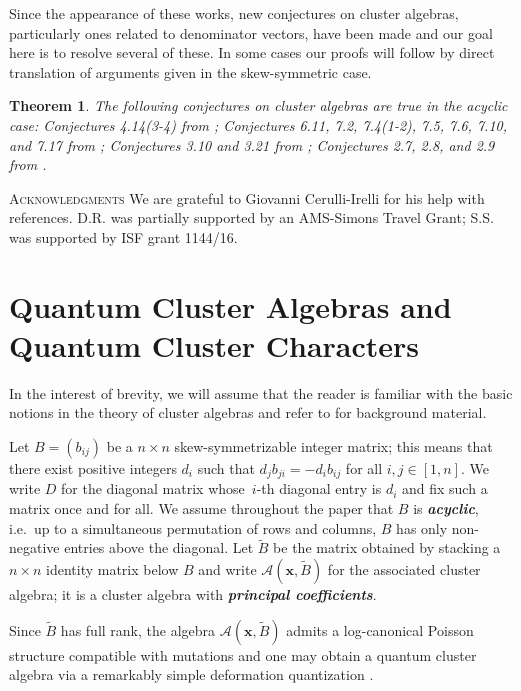 \documentclass[12pt]{amsart}
\newtheorem{theorem}{Theorem}
\newcommand{\bfx}{\mathbf{x}}
\newcommand{\cA}{\mathcal{A}}
\newcommand{\newword}[1]{\textbf{\emph{#1}}}
\begin{document}
  Since the appearance of these works, new conjectures on cluster algebras, particularly ones related to denominator vectors, have been made and our goal here is to resolve several of these.
  In some cases our proofs will follow by direct translation of arguments given in the skew-symmetric case. 
  \begin{theorem}
    \label{thm:main}
    The following conjectures on cluster algebras are true in the acyclic case: Conjectures 4.14(3-4) from \cite{FZ03}; Conjectures 6.11, 7.2, 7.4(1-2), 7.5, 7.6, 7.10, and 7.17 from \cite{fomin-zelevinsky4}; Conjectures 3.10 and 3.21 from \cite{reading-speyer}; Conjectures 2.7, 2.8, and 2.9 from \cite{reading-stella}.
  \end{theorem}

\textsc{Acknowledgments}
  We are grateful to Giovanni Cerulli-Irelli for his help with references.
  D.R. was partially supported by an AMS-Simons Travel Grant; S.S. was supported by ISF grant 1144/16.

\section{Quantum Cluster Algebras and Quantum Cluster Characters}
\label{sec:qca}
  
  In the interest of brevity, we will assume that the reader is familiar with the basic notions in the theory of cluster algebras and refer to \cite{fomin-zelevinsky4} for background material.

  Let $B=(b_{ij})$ be a $n\times n$ skew-symmetrizable integer matrix; this means that there exist positive integers $d_i$ such that $d_jb_{ji}=-d_ib_{ij}$ for all $i,j\in[1,n]$. 
  We write $D$ for the diagonal matrix whose~$i$-th diagonal entry is $d_i$ and fix such a matrix once and for all.
  We assume throughout the paper that $B$ is \newword{acyclic}, i.e.\ up to a simultaneous permutation of rows and columns, $B$ has only non-negative entries above the diagonal.
  Let $\widetilde{B}$ be the matrix obtained by stacking a $n\times n$ identity matrix below $B$ and write $\cA(\bfx,\widetilde{B})$ for the associated cluster algebra; it is a cluster algebra with \newword{principal coefficients}.

  Since $\widetilde{B}$ has full rank, the algebra $\cA(\bfx,\widetilde{B})$ admits a log-canonical Poisson structure compatible with mutations \cite{gekhtman-shapiro-vainshtein} and one may obtain a quantum cluster algebra via a remarkably simple deformation quantization \cite{berenstein-zelevinsky}.  
\end{document}
